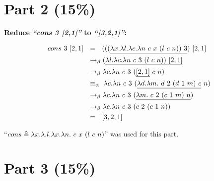 \documentclass{article}
\begin{document}
	
		
	\section{Part 2 (15\%)}
	
	\begin{Large}
	
		\textbf{Reduce \textit{``cons 3 [2,1]''} to \textit{``[3,2,1]''}:}
		
		\begin{align*}
			cons \ 3 \ [2,1] \saq &= \saq (((\underline{\la x.\la l.\la c.\la n \ c \ x \ (l \ c \ n))\ 3}) \ [2,1] \\
			&\equals (\underline{\la l.\la c.\la n \ c \ 3 \ (l \ c \ n)) \ [2,1]} \\
			&\equals \la c.\la n \ c \ 3 \ (\underline{[2,1]} \ c \ n) \\
			&\equiv_\alpha \, \, \la c.\la n \ c \ 3 \ (\underline{\la d.\la m. \ d \ 2 \ (d \ 1 \ m) \ c} \ n) \\
			&\equals \la c.\la n \ c \ 3 \ (\underline{\la m. \ c \ 2 \ (c \ 1 \ m) \ n}) \\
			&\equals \la c.\la n \ c \ 3 \ ( c \ 2 \ (c \ 1 \ n)) \\
			&= \saq [3,2,1]
		\end{align*}
		
		``$cons \triangleq \lambda x.\lambda .l.\lambda x.\lambda n. \ c \ x \ (l \ c \ n)$'' was used for this part.
		
	\end{Large}
	\newpage
	
	
	
	\section{Part 3 (15\%)}
\end{document}
